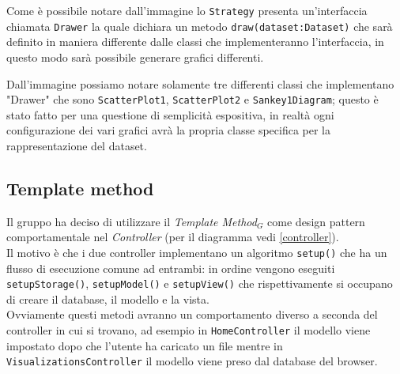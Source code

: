 Come è possibile notare dall'immagine lo \texttt{Strategy} presenta un'interfaccia chiamata \texttt{Drawer} la quale dichiara un metodo \texttt{draw(dataset:Dataset)} che sarà definito in maniera differente dalle classi che implementeranno l'interfaccia, in questo modo sarà possibile generare grafici differenti.

Dall'immagine possiamo notare solamente tre differenti classi che implementano "Drawer" che sono \texttt{ScatterPlot1}, \texttt{ScatterPlot2} e \texttt{Sankey1Diagram}; questo è stato fatto per una questione di semplicità espositiva, in realtà ogni configurazione dei vari grafici avrà la propria classe specifica per la rappresentazione del dataset. \\

\subsection{Template method}
Il gruppo ha deciso di utilizzare il \textit{Template Method}$_G$ come design pattern comportamentale nel \textit{Controller} (per il diagramma vedi \ref{controller}). \\Il motivo è che i due controller implementano un algoritmo \texttt{setup()} che ha un flusso di esecuzione comune ad entrambi: in ordine vengono eseguiti \texttt{setupStorage()}, \texttt{setupModel()} e \texttt{setupView()} che rispettivamente si occupano di creare il database, il modello e la vista. \\Ovviamente questi metodi avranno un comportamento diverso a seconda del controller in cui si trovano, ad esempio in \texttt{HomeController} il modello viene impostato dopo che l'utente ha caricato un file mentre in \texttt{VisualizationsController} il modello viene preso dal database del browser.
